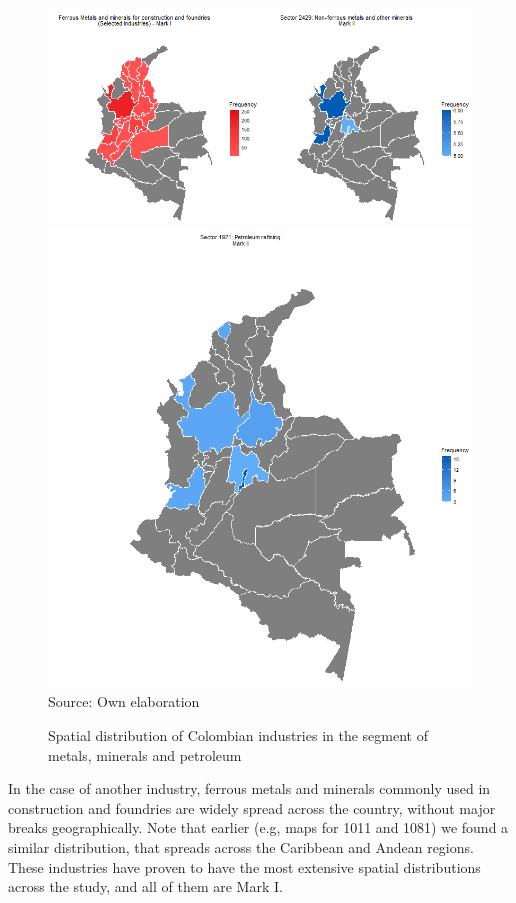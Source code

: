 \documentclass[12pt,a4paper]{article}
\begin{document}
\begin{figure}
	\caption{Spatial distribution of Colombian industries in the segment of metals, minerals and petroleum}
	\centering
	\includegraphics[scale=0.6]{metals} \\
	\includegraphics[scale=0.3]{petrol} \\
	Source: Own elaboration
\end{figure}

In the case of another industry, ferrous metals and minerals commonly used in construction and foundries are widely spread across the country, without major breaks geographically. Note that earlier (e.g, maps for 1011 and 1081) we found a similar distribution, that spreads across the Caribbean and Andean regions. These industries have proven to have the most extensive spatial distributions across the study, and all of them are Mark I.
\end{document}
